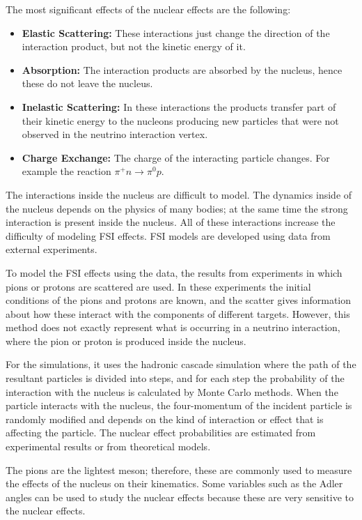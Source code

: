 The most significant effects of the nuclear effects are the following:

\begin{itemize}
    \item \textbf{Elastic Scattering:} These interactions just change the direction of the interaction product, but not the kinetic energy of it.  
    \item \textbf{Absorption:} The interaction products are absorbed by the nucleus, hence these do not leave the nucleus.
    \item \textbf{Inelastic Scattering:} In these interactions the products transfer part of their kinetic energy to the nucleons producing new particles that were not observed in the neutrino interaction vertex. 
    \item \textbf{Charge Exchange:} The charge of the interacting particle changes. For example the reaction $\pi^+ n \rightarrow \pi^0 p$.
\end{itemize}

The interactions inside the nucleus are difficult to model. The dynamics inside of the nucleus depends on the physics of many bodies; at the same time the strong interaction is present inside the nucleus. All of these interactions increase the difficulty of modeling FSI effects. FSI models are developed using data from external experiments.

To model the FSI effects using the data, the results from experiments in which pions or protons are scattered are used. In these experiments the initial conditions of the pions and protons are known, and the scatter gives information about how these interact with the components of different targets. However, this method does not exactly represent what is occurring in a neutrino interaction, where the pion or proton is produced inside the nucleus.

For the simulations, it uses the hadronic cascade simulation where the path of the resultant particles is divided into steps, and for each step the probability of the interaction with the nucleus is calculated by Monte Carlo methods. When the particle interacts with the nucleus, the four-momentum of the incident particle is randomly modified and depends on the kind of interaction or effect that is affecting the particle. The nuclear effect probabilities are estimated from experimental results or from theoretical models.

The pions are the lightest meson; therefore, these are commonly used to measure the effects of the nucleus on their kinematics. Some variables such as the Adler angles\cite{S_nchez_2016} can be used to study the nuclear effects because these are very sensitive to the nuclear effects.

